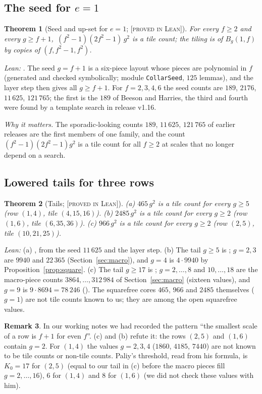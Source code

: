 \documentclass[11pt,reqno]{amsart}
\theoremstyle{plain}
\newtheorem{theorem}{Theorem}[section]
\theoremstyle{definition}
\newtheorem{remark}[theorem]{Remark}
\newcommand{\lab}[1]{\textup{[\textsc{#1}]}}
\newcommand{\PL}{\lab{proved in Lean}}
\newcommand{\why}[1]{\par\smallskip\noindent\emph{Why it matters.} #1\par}
\begin{document}
\subsection{The seed for $e=1$}
\begin{theorem}[Seed and up-set for $e=1$; \PL{}]\label{thm:seedA}
For every $f\ge2$ and every $g\ge f+1$, $\,(f^2-1)(2f^2-1)\,g^2$ is a tile count; the tiling is of $B_g(1,f)$ by copies of $(f,f^2-1,f^2)$.
\end{theorem}
\emph{Lean:} . The seed $g=f+1$ is a six-piece layout whose pieces are polynomial in $f$ (generated and checked symbolically; module \texttt{CollarSeed}, $125$ lemmas), and the layer step then gives all $g\ge f+1$.
For $f=2,3,4,6$ the seed counts are $189$, $2176$, $11\,625$, $121\,765$; the first is the $189$ of Beeson and Harries, the third and fourth were found by a template search in release v1.16.
\why{The sporadic-looking counts $189$, $11\,625$, $121\,765$ of earlier releases are the first members of one family, and the count $(f^2-1)(2f^2-1)g^2$ is a tile count for all $f\ge2$ at scales that no longer depend on a search.}

\subsection{Lowered tails for three rows}
\begin{theorem}[Tails; \PL{}]\label{thm:tails}
(a) $465\,g^2$ is a tile count for every $g\ge5$ (row $(1,4)$, tile $(4,15,16)$).
(b) $2485\,g^2$ is a tile count for every $g\ge2$ (row $(1,6)$, tile $(6,35,36)$).
(c) $966\,g^2$ is a tile count for every $g\ge2$ (row $(2,5)$, tile $(10,21,25)$).
\end{theorem}
\emph{Lean:} (a) , from the seed $11\,625$ and the layer step. (b) The tail $g\ge5$ is ; $g=2,3$ are $9940$ and $22\,365$ (Section~\ref{sec:macro}), and $g=4$ is $4\cdot9940$ by Proposition~\ref{prop:square}. (c) The tail $g\ge17$ is ; $g=2,\dots,8$ and $10,\dots,18$ are the macro-piece counts $3864,\dots,312\,984$ of Section~\ref{sec:macro} (sixteen values), and $g=9$ is $9\cdot8694=78\,246$ ().
The squarefree cores $465$, $966$ and $2485$ themselves ($g=1$) are not tile counts known to us; they are among the open squarefree values.
\begin{remark}
In our working notes we had recorded the pattern ``the smallest scale of a row is $f+1$ for even $f$''. (c) and (b) refute it: the rows $(2,5)$ and $(1,6)$ contain $g=2$.
For $(1,4)$ the values $g=2,3,4$ ($1860$, $4185$, $7440$) are not known to be tile counts or non-tile counts.
Paliy's threshold, read from his formula, is $K_0=17$ for $(2,5)$ (equal to our tail in (c) before the macro pieces fill $g=2,\dots,16$), $6$ for $(1,4)$ and $8$ for $(1,6)$ (we did not check these values with him).
\end{remark}
\end{document}
